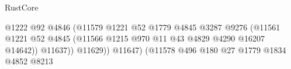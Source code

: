 \begin{lexlean}{RustCore}
\begin{coremodule}
                                                                      @1222
                                                                      @92
                                                                      @4846
                                                                      (@11579
                                                                        @1221
                                                                        @52
                                                                        @1779
                                                                        @4845
                                                                        @3287
                                                                        @9276
                                                                        (@11561
                                                                          @1221
                                                                          @52
                                                                          @4845
                                                                          (@11566
                                                                            @1215
                                                                            @970
                                                                            @11
                                                                            @43
                                                                            @4829
                                                                            @4290
                                                                            @16207
                                                                            @14642))
                                                                        @11637))
                                                                    @11629))
                                                                @11647)
                                                              (@11578
                                                                @496
                                                                @180
                                                                @27
                                                                @1779
                                                                @1834
                                                                @4852
                                                                @8213

\end{coremodule}
\end{lexlean}
